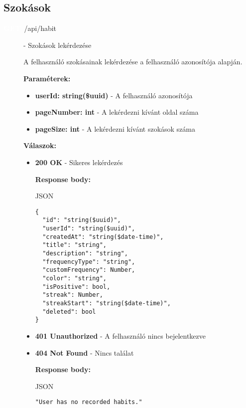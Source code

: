 \documentclass[12pt]{report}
\newcommand{\httpGet}[1]{\colorbox{getColor}{\textbf{\textcolor{white}{GET}}}~#1}
\begin{document}
\subsection{Szokások}
\begin{description}
  \item[\httpGet{/api/habit}] - Szokások lekérdezése

    \vspace{0.5cm}
    A felhasználó szokásainak lekérdezése a felhasználó azonosítója alapján.

    \vspace{0.5cm}
    \textbf{Paraméterek:}
    \begin{itemize}
      \item \textbf{userId: string(\$uuid)} - A felhasználó azonosítója
      \item \textbf{pageNumber: int} - A lekérdezni kívánt oldal száma
      \item \textbf{pageSize: int} - A lekérdezni kívánt szokások száma
    \end{itemize}

    \vspace{0.5cm}
    \textbf{Válaszok:}
    \begin{itemize}
      \item \textbf{200 OK} - Sikeres lekérdezés

        \textbf{Response body:}
        \begin{codeblock}{JSON}
          \begin{verbatim}
{
  "id": "string($uuid)",
  "userId": "string($uuid)",
  "createdAt": "string($date-time)",
  "title": "string",
  "description": "string",
  "frequencyType": "string",
  "customFrequency": Number,
  "color": "string",
  "isPositive": bool,
  "streak": Number,
  "streakStart": "string($date-time)",
  "deleted": bool
}
          \end{verbatim}
        \end{codeblock}

      \item \textbf{401 Unauthorized} - A felhasználó nincs bejelentkezve

      \item \textbf{404 Not Found} - Nincs találat
      
        \textbf{Response body:}
        \begin{codeblock}{JSON}
          \begin{verbatim}
"User has no recorded habits."
          \end{verbatim}
        \end{codeblock}
    \end{itemize}


\end{description}
\end{document}
